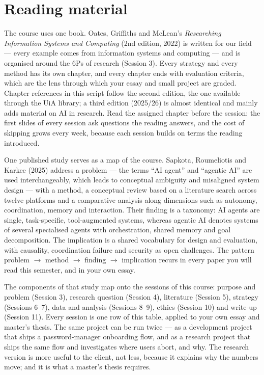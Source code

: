 \documentclass[11pt,a4paper,british,twoside=false,headings=small,chapterprefix=false,numbers=noenddot]{scrbook}
\begin{document}
\section{Reading material}

The course uses one book. Oates, Griffiths and McLean's \emph{Researching Information Systems and Computing} (2nd edition, 2022) is written for our field --- every example comes from information systems and computing --- and is organised around the 6Ps of research (Session 3). Every strategy and every method has its own chapter, and every chapter ends with evaluation criteria, which are the lens through which your essay and small project are graded. Chapter references in this script follow the second edition, the one available through the UiA library; a third edition (2025/26) is almost identical and mainly adds material on AI in research. Read the assigned chapter before the session: the first slides of every session ask questions the reading answers, and the cost of skipping grows every week, because each session builds on terms the reading introduced.

One published study serves as a map of the course. Sapkota, Roumeliotis and Karkee (2025) address a problem --- the terms ``AI agent'' and ``agentic AI'' are used interchangeably, which leads to conceptual ambiguity and misaligned system design --- with a method, a conceptual review based on a literature search across twelve platforms and a comparative analysis along dimensions such as autonomy, coordination, memory and interaction. Their finding is a taxonomy: AI agents are single, task-specific, tool-augmented systems, whereas agentic AI denotes systems of several specialised agents with orchestration, shared memory and goal decomposition. The implication is a shared vocabulary for design and evaluation, with causality, coordination failure and security as open challenges. The pattern problem $\rightarrow$ method $\rightarrow$ finding $\rightarrow$ implication recurs in every paper you will read this semester, and in your own essay.

The components of that study map onto the sessions of this course: purpose and problem (Session 3), research question (Session 4), literature (Session 5), strategy (Sessions 6--7), data and analysis (Sessions 8--9), ethics (Session 10) and write-up (Session 11). Every session is one row of this table, applied to your own essay and master's thesis. The same project can be run twice --- as a development project that ships a password-manager onboarding flow, and as a research project that ships the same flow and investigates where users abort, and why. The research version is more useful to the client, not less, because it explains why the numbers move; and it is what a master's thesis requires.
\end{document}
